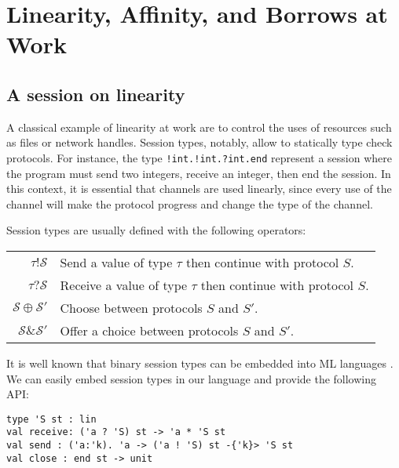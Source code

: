 \section{Linearity, Affinity, and Borrows at Work}


\subsection{A session on linearity}

A classical example of linearity at work are to control the uses of resources such
as files or network handles.
%
Session types, notably, allow to statically type check protocols.
For instance, the type \lstinline{!int.!int.?int.end} represent a session
where the program must send two integers, receive an integer, then end the session.
%
In this context, it is essential that channels
are used linearly, since every use of the channel
will make the protocol progress and change the type of the channel.

Session types are usually defined with the following operators:

\begin{center}
  \begin{tabular}{r l}
    $\tau ! \mathcal S$ & Send a value of type $\tau$ then continue with protocol $S$.\\
    $\tau ? \mathcal S$& Receive a value of type $\tau$ then continue with protocol $S$.\\
    $\mathcal S \oplus \mathcal S'$& Choose between protocols $S$ and $S'$.\\
    $\mathcal S \operatorname{\&} \mathcal S'$& Offer a choice between protocols $S$ and $S'$.
  \end{tabular}
\end{center}

It is well known that binary session types can be embedded into ML languages
\cite{DBLP:journals/jfp/Padovani17}. We can easily
embed session types in our language and provide the following API:

\begin{lstlisting}
type 'S st : lin
val receive: ('a ? 'S) st -> 'a * 'S st
val send : ('a:'k). 'a -> ('a ! 'S) st -{'k}> 'S st
val close : end st -> unit
\end{lstlisting}



